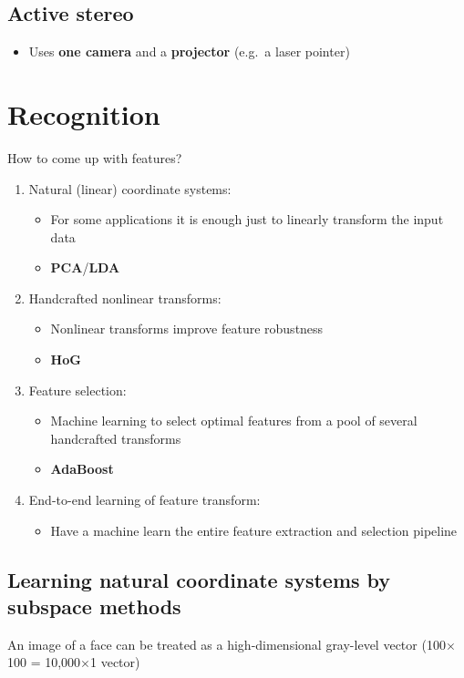 \documentclass{article}
\begin{document}
    \subsection{Active stereo}
    \begin{itemize}
        \item Uses \textbf{one camera} and a \textbf{projector} (e.g.\ a laser pointer)
    \end{itemize}

    \newpage

\section{Recognition}
How to come up with features?
\begin{enumerate}
    \item Natural (linear) coordinate systems:
    \begin{itemize}
        \item For some applications it is enough just to linearly transform the input data
        \item \textbf{PCA}/\textbf{LDA}
    \end{itemize}
    \item Handcrafted nonlinear transforms:
    \begin{itemize}
        \item Nonlinear transforms improve feature robustness
        \item \textbf{HoG}
    \end{itemize}
    \item Feature selection:
    \begin{itemize}
        \item Machine learning to select optimal features from a pool of several handcrafted transforms
        \item \textbf{AdaBoost}
    \end{itemize}
    \item End-to-end learning of feature transform:
    \begin{itemize}
        \item Have a machine learn the entire feature extraction and selection pipeline
    \end{itemize}
\end{enumerate}

    \subsection{Learning natural coordinate systems by subspace methods}
    An image of a face can be treated as a high-dimensional gray-level vector (100$\times$100 = 10,000$\times$1 vector) 
    
\end{document}
